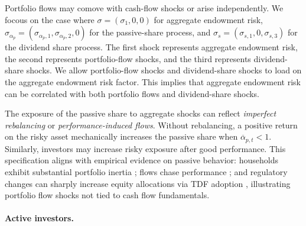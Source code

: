 \documentclass[12pt,english]{article}
\begin{document}
Portfolio flows may comove with cash-flow shocks or arise independently. 
We focous on the case where $\sigma=(\sigma_1,0,0)$ for aggregate endowment risk, $\sigma_{\alpha_p}=(\sigma_{\alpha_p,1},\sigma_{\alpha_p,2},0)$ for the passive-share process, and $\sigma_s=(\sigma_{s,1},0,\sigma_{s,3})$ for the dividend share process.
The first shock represents aggregate endowment risk, the second represents portfolio-flow shocks, and the third represents dividend-share shocks.
We allow portfolio-flow shocks and dividend-share shocks to load on the aggregate endowment risk factor.
This implies that aggregate endowment risk can be correlated with both portfolio flows and dividend-share shocks.

The exposure of the passive share to aggregate shocks can reflect \emph{imperfect rebalancing} or \emph{performance-induced flows}. 
Without rebalancing, a positive return on the risky asset mechanically increases the passive share when $\overline{\alpha}_{p,t}<1$. 
Similarly, investors may increase risky exposure after good performance. 
This specification aligns with empirical evidence on passive behavior: households exhibit substantial portfolio inertia \citep{ameriks2011household,brunnermeier2008wealth}; flows chase performance \citep{chevalier1997risk,dannhauser2024flow}; and regulatory changes can sharply increase equity allocations via TDF adoption \citep{parker2022household}, illustrating portfolio flow shocks not tied to cash flow fundamentals.



\paragraph{Active investors.} 
\end{document}
